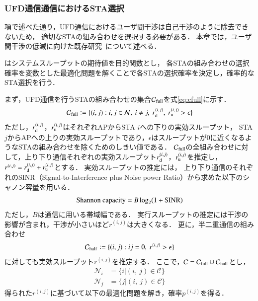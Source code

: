 \documentclass[master]{kuisthesis}		%
\newcommand{\sij}{(i,j)}
\newcommand{\pij}{p^{(i,j)}}
\newcommand{\rd}{r^{\sij}_{\rm d}}
\newcommand{\ru}{r^{\sij}_{\rm u}}
\newcommand{\rij}{r^{\sij}}
\def\coloneqq{\mathrel{\mathop:}=}
\begin{document}
		\subsubsection{UFD通信通信におけるSTA選択}
			\label{sec:interference}項で述べた通り，UFD通信における\cite{promac}ユーザ間干渉は自己干渉のように除去できないため，
			適切なSTAの組み合わせを選択する必要がある．
			本章では，ユーザ間干渉の低減に向けた既存研究~\cite{promac}について述べる．
			\par
			\cite{promac}はシステムスループットの期待値を目的関数とし，
			各STAの組み合わせの選択確率を変数とした最適化問題を解くことで各STAの選択確率を決定し，確率的なSTA選択を行う．
			\par
			まず，UFD通信を行うSTAの組み合わせの集合${\mathcal C}_{\rm full}$を式\eqref{eq:cfull}に示す．
			\begin{equation}
				{\mathcal C}_{\rm full} \coloneqq \{\sij : i,j\in{\mathcal N},\ i\neq j,\ r^{\sij}_{\rm d},\ r^{\sij}_{\rm u}>\epsilon\} \label{eq:cfull}
			\end{equation}
			ただし，$r_{\rm d}^{\sij}$，$r_{\rm u}^{\sij}$はそれぞれAPからSTA $i$への下りの実効スループット，
			STA $j$からAPへの上りの実効スループットであり，$\epsilon$はスループットが0に近くなるようなSTAの組み合わせを除くためのしきい値である．
			${\mathcal C}_{\rm full}$の全組み合わせに対して，上り下り通信それぞれの実効スループット$\rd$，$\ru$を推定し，$\rij=\rd + \ru$とする．
			実効スループットの推定には，
			上り下り通信のそれぞれのSINR（Signal-to-Interference plus Noise power Ratio）から求めた以下のシャノン容量を用いる．
			\begin{equation}
				{\rm Shannon\ capacity}=B\log_2(1+{\rm SINR}) \label{eq:capacity}
			\end{equation}
			ただし，$B$は通信に用いる帯域幅である．
			実行スループットの推定には干渉の影響が含まれ，干渉が小さいほど$\rij$は大きくなる．
			更に，半二重通信の組み合わせ
			\begin{equation}
				{\mathcal C}_{\rm half} \coloneqq \{\sij : ij=0,\ \rij >\epsilon\}
			\end{equation}
			に対しても実効スループット$\rij$を推定する．
			ここで，${\mathcal C} = {\mathcal C}_{\rm full} \cup {\mathcal C}_{\rm half}$とし，
			\begin{align}
				{\mathcal N}_i &= \{i|(i,\ j)\in{\mathcal C}\}\\
				{\mathcal N}_j &= \{j|(i,\ j)\in{\mathcal C}\}
			\end{align}
			得られた$\rij$に基づいて以下の最適化問題を解き，確率$\pij$を得る．
\end{document}
